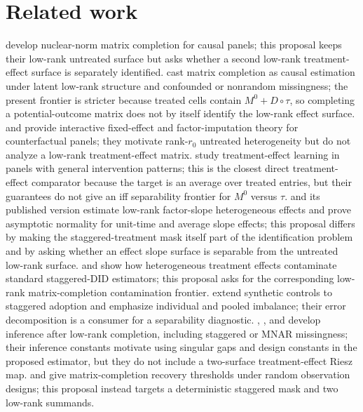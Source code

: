 \documentclass[11pt]{article}
\theoremstyle{definition}
\theoremstyle{plain}
\theoremstyle{remark}
\begin{document}
\section{Related work}
\citet[Sections 2--3]{AtheyBayatiDoudchenkoImbensKhosravi2021} develop nuclear-norm matrix completion for causal panels; this proposal keeps their low-rank untreated surface but asks whether a second low-rank treatment-effect surface is separately identified.  \citet[Sections 2--3]{AgarwalDahlehShahShen2023} cast matrix completion as causal estimation under latent low-rank structure and confounded or nonrandom missingness; the present frontier is stricter because treated cells contain \(M^0+D\circ\tau\), so completing a potential-outcome matrix does not by itself identify the low-rank effect surface.  \citet{Bai2009} and \citet{BaiNg2021} provide interactive fixed-effect and factor-imputation theory for counterfactual panels; they motivate rank-\(r_0\) untreated heterogeneity but do not analyze a low-rank treatment-effect matrix.  \citet[Sections 2--3]{FariasLiPeng2021} study treatment-effect learning in panels with general intervention patterns; this is the closest direct treatment-effect comparator because the target is an average over treated entries, but their guarantees do not give an iff separability frontier for \(M^0\) versus \(\tau\).  \citet[Sections 1--2]{ChernozhukovHansenLiaoZhu2019} and its published version \citet[Sections 1--2]{ZhuLiaoHansenChernozhukov2026} estimate low-rank factor-slope heterogeneous effects and prove asymptotic normality for unit-time and average slope effects; this proposal differs by making the staggered-treatment mask itself part of the identification problem and by asking whether an effect slope surface is separable from the untreated low-rank surface.  \citet[Sections 3--4]{SunAbraham2021} and \citet{DeChaisemartinDHaultfoeuille2020} show how heterogeneous treatment effects contaminate standard staggered-DID estimators; this proposal asks for the corresponding low-rank matrix-completion contamination frontier.  \citet[Section 2.2 and Theorem 1]{BenMichaelFellerRothstein2022} extend synthetic controls to staggered adoption and emphasize individual and pooled imbalance; their error decomposition is a consumer for a separability diagnostic.  \citet[Sections 2--3 and Theorem 3.1]{ChoiKwonLiao2024}, \citet[Sections 2--3]{ChoiYuan2024}, and \citet[Section 3 and Theorems 1--2]{YanWainwright2024} develop inference after low-rank completion, including staggered or MNAR missingness; their inference constants motivate using singular gaps and design constants in the proposed estimator, but they do not include a two-surface treatment-effect Riesz map.  \citet[Theorem 1.2]{CandesTao2010} and \citet[Theorem 1.1]{KeshavanMontanariOhFew2010} give matrix-completion recovery thresholds under random observation designs; this proposal instead targets a deterministic staggered mask and two low-rank summands.
\end{document}
